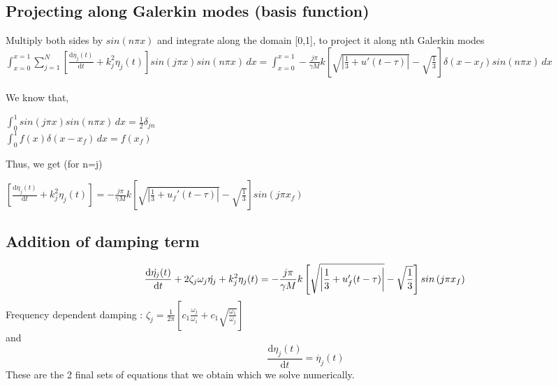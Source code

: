 \documentclass[8pt]{article} %
\begin{document}
\subsection{Projecting along Galerkin modes (basis function)}

Multiply both sides by $sin\left( n \pi x \right)$ and integrate along the domain [0,1], to project it along nth Galerkin modes\\

$ \int_{x=0}^{x=1} \sum_{j = 1}^{N} \left[  \frac{\mathrm{d} \dot{\eta_j}(t)}{\mathrm{d} t}    + k_j^2  \eta_j (t) \right] sin\left( j \pi x \right) sin\left( n \pi x \right) \,dx   =  \int_{x=0}^{x=1} - \frac{j \pi}{\gamma M} k \left[ \sqrt{\left| \frac{1}{3} + u'(t-\tau)\right| } - \sqrt{\frac{1}{3}} \right] \delta(x - x_f) sin\left( n \pi x \right) \,dx  $\\\\
We know that,
\begin{center}
$\int_{0}^{1} sin\left( j \pi x \right) sin\left( n \pi x \right) \, dx = \frac{1}{2} \delta_{jn}$\\
$\int_{0}^{1} f(x) \delta(x - x_f) \, dx  = f(x_f)$ 
\end{center}
Thus, we get (for n=j)
\begin{center}
$   \left[  \frac{\mathrm{d} \dot{\eta_j}(t)}{\mathrm{d} t} + k_j^2  \eta_j (t) \right]  =  - \frac{j \pi}{\gamma M} k \left[ \sqrt{\left| \frac{1}{3} + u_f'(t-\tau)\right| } - \sqrt{\frac{1}{3}} \right] sin\left( j \pi x_f \right) $\\
\end{center}
\subsection{Addition of damping term}
\begin{equation}\label{e:1}
  \frac{\mathrm{d} \dot{\eta_j}(t)}{\mathrm{d} t} + 2 \zeta_j \omega_j \dot{\eta_j}  + k_j^2  \eta_j (t)  = - \frac{j \pi}{\gamma M} k \left[ \sqrt{\left| \frac{1}{3} + u_f'(t-\tau)\right| } - \sqrt{\frac{1}{3}} \right] sin\left( j \pi x_f \right) \\
\end{equation}
Frequency dependent damping : $\zeta_j = \frac{1}{2\pi} \left[ c_1 \frac{\omega_j}{\omega_1} + c_1 \sqrt{\frac{\omega_1}{\omega_j}} \right]$\\
and
\begin{equation}\label{e:2}
    \frac{\mathrm{d} \eta_j (t)}{\mathrm{d} t} = \dot{\eta_j}(t)
\end{equation}
These are the 2 final sets of equations that we obtain which we solve numerically. 
\end{document}

